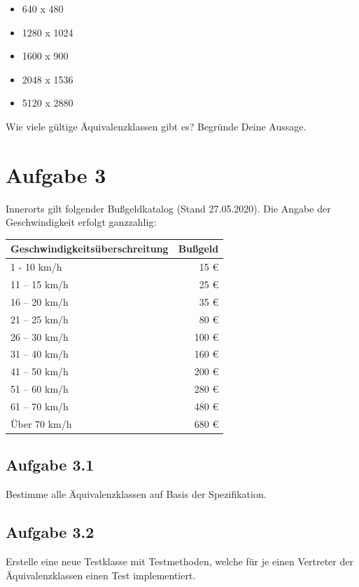 \begin{itemize}
  \item 640 x 480
  \item 1280 x 1024
  \item 1600 x 900
  \item 2048 x 1536
  \item 5120 x 2880
\end{itemize}

Wie viele gültige Äquivalenzklassen gibt es? Begründe Deine Aussage.

\newpage
\section*{Aufgabe 3}
Innerorts gilt folgender Bußgeldkatalog (Stand 27.05.2020). Die Angabe der Geschwindigkeit erfolgt ganzzahlig:

\vspace{.3cm}

\begin{center}
\begin{tabular}{|l|r|}
\hline
\rowcolor{ivory}
\textbf{Geschwindigkeitsüberschreitung} & \textbf{Bußgeld} \\ \hline
1 - 10 km/h                      & 15 €    \\ \hline
11 – 15 km/h 	                 & 25 €	   \\ \hline
16 – 20 km/h 	                 & 35 €	   \\ \hline
21 – 25 km/h 	                 & 80 €	   \\ \hline
26 – 30 km/h 	                 & 100 €   \\ \hline
31 – 40 km/h 	                 & 160 €   \\ \hline
41 – 50 km/h 	                 & 200 €   \\ \hline
51 – 60 km/h 	                 & 280 €   \\ \hline
61 – 70 km/h 	                 & 480 €   \\ \hline
Über 70 km/h 	                 & 680 €   \\ \hline
\end{tabular}
\end{center}

\subsection*{Aufgabe 3.1}
Bestimme alle Äquivalenzklassen auf Basis der Spezifikation.

\subsection*{Aufgabe 3.2}
Erstelle eine neue Testklasse mit Testmethoden, welche für je einen Vertreter der Äquivalenzklassen einen Test implementiert.

